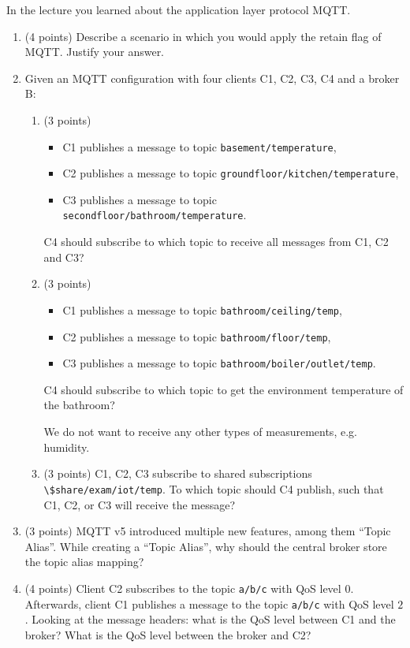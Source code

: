 \documentclass[12pt]{article}
\begin{document}
    \begin{ejercicio}[20 points]
        In the lecture you learned about the application layer protocol MQTT.
        \begin{enumerate}[label=\alph*)]
            \item (4 points) Describe a scenario in which you would apply the retain flag of MQTT. Justify your answer.
            \item Given an MQTT configuration with four clients C1, C2, C3, C4 and a broker B:
            \begin{enumerate}[label=\roman*)]
                \item (3 points)
                \begin{itemize}
                    \item C1 publishes a message to topic \verb|basement/temperature|,
                    \item C2 publishes a message to topic \verb|groundfloor/kitchen/temperature|,
                    \item C3 publishes a message to topic \verb|secondfloor/bathroom/temperature|.
                \end{itemize}
                C4 should subscribe to which topic to receive all messages from C1, C2 and C3?
                \item (3 points)
                \begin{itemize}
                    \item C1 publishes a message to topic \verb|bathroom/ceiling/temp|,
                    \item C2 publishes a message to topic \verb|bathroom/floor/temp|,
                    \item C3 publishes a message to topic \verb|bathroom/boiler/outlet/temp|.
                \end{itemize}
                C4 should subscribe to which topic to get the environment temperature of the bathroom?
                \begin{observacion}
                    We do not want to receive any other types of measurements, e.g. humidity.
                \end{observacion}
                \item (3 points) C1, C2, C3 subscribe to shared subscriptions \verb|\$share/exam/iot/temp|. To which topic should C4 publish, such that C1, C2, or C3 will receive the message?
            \end{enumerate}
            \item (3 points) MQTT v5 introduced multiple new features, among them ``Topic Alias''. While creating a ``Topic Alias'', why should the central broker store the topic alias mapping?
            
            \item (4 points) Client C2 subscribes to the topic \verb|a/b/c| with QoS level $0$. Afterwards, client C1 publishes a message to the topic \verb|a/b/c| with QoS level $2$. Looking at the message headers: what is the QoS level between C1 and the broker? What is the QoS level between the broker and C2?
        \end{enumerate}
    \end{ejercicio}
\end{document}
